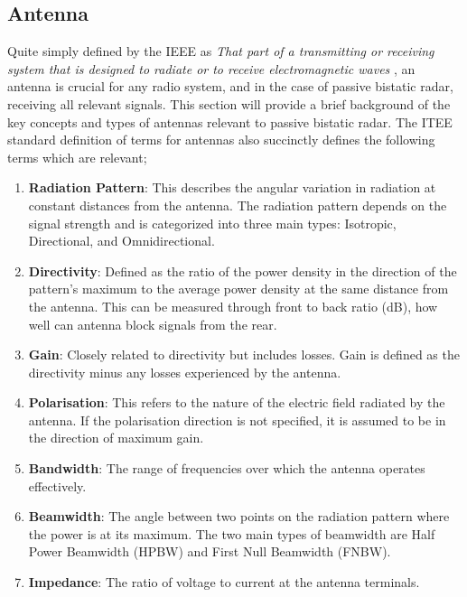 \subsection{Antenna \label{sec: antennaBackground}}
Quite simply defined by the IEEE as \textit{That part of a transmitting or receiving system that is designed to radiate or to receive electromagnetic waves} \cite{AntennaIEEE}, an antenna is crucial for any radio system, and in the case of passive bistatic radar, receiving all relevant signals. This section will provide a brief background of the key concepts and types of antennas relevant to passive bistatic radar. The ITEE standard definition of terms for antennas \cite{AntennaIEEE} also succinctly defines the following terms which are relevant;
\begin{enumerate}
    \item \textbf{Radiation Pattern}: This describes the angular variation in radiation at constant distances from the antenna. The radiation pattern depends on the signal strength and is categorized into three main types: Isotropic, Directional, and Omnidirectional.
    
    \item \textbf{Directivity}: Defined as the ratio of the power density in the direction of the pattern's maximum to the average power density at the same distance from the antenna. This can be measured through front to back ratio (dB), how well can antenna block signals from the rear.
    
    \item \textbf{Gain}: Closely related to directivity but includes losses. Gain is defined as the directivity minus any losses experienced by the antenna.
    
    \item \textbf{Polarisation}: This refers to the nature of the electric field radiated by the antenna. If the polarisation direction is not specified, it is assumed to be in the direction of maximum gain.
    
    \item \textbf{Bandwidth}: The range of frequencies over which the antenna operates effectively.
    
    \item \textbf{Beamwidth}: The angle between two points on the radiation pattern where the power is at its maximum. The two main types of beamwidth are Half Power Beamwidth (HPBW) and First Null Beamwidth (FNBW).
    
    \item \textbf{Impedance}: The ratio of voltage to current at the antenna terminals.
\end{enumerate}


